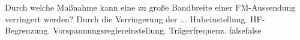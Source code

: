     {Durch welche Maßnahme kann eine zu große Bandbreite einer FM-Aussendung verringert werden? Durch die Verringerung der ...}
    {Hubeinstellung.}
    {HF-Begrenzung.}
    {Vorspannungsreglereinstellung.}
    {Trägerfrequenz.}
    {false}{false}